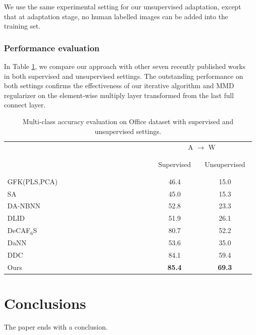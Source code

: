 \documentclass[runningheads]{llncs}
\begin{document}
We use the same experimental setting for our unsupervised adaptation, except that at adaptation stage, no human labelled images can be added into the training set.
\subsubsection{Performance evaluation}
In Table \ref{table:office}, we compare our approach with other seven recently published works in both supervised and unsupervised settings. The outstanding performance on both settings confirms the effectiveness of our iterative algorithm and MMD regularizer on the element-wise multiply layer transformed from the last full connect layer.


\begin{table}
\centering
\caption{Multi-class accuracy evaluation on Office dataset with supervised and unsupervised settings.} \label{table:office}
\begin{tabular}{l c c}
  \hline
   & \multicolumn{2}{c}{A $\rightarrow$ W}    \\
   \cline{2-3}
   ~~~~~~~~~~~~~~~~~~~~~~~~~~~~~~~
   ~~~~~~~~~~~~~~~~~~~~~~~~~~~~~~~
    & ~Supervised~ & ~Unsupervised~ \\
  \hline
  GFK(PLS,PCA)\cite{gong2012geodesic} & 46.4 & 15.0 \\
  SA \cite{fernando2013unsupervised} & 45.0 & 15.3 \\
  DA-NBNN \cite{tommasi2013frustratingly} & 52.8 & 23.3 \\
  DLID \cite{chopra2013dlid}& 51.9 & 26.1 \\
  DeCAF${}_{6}$S \cite{donahue2013decaf} & 80.7 & 52.2 \\
  DaNN \cite{ghifary2014domain}& 53.6 & 35.0 \\
  DDC\cite{tzeng2014deep} & 84.1 & 59.4 \\
  \hline
  Ours & {\bf 85.4} & {\bf 69.3} \\
  \hline
\end{tabular}
\end{table}


\section{Conclusions}
\label{section:Conclusions}

The paper ends with a conclusion.





\end{document}
